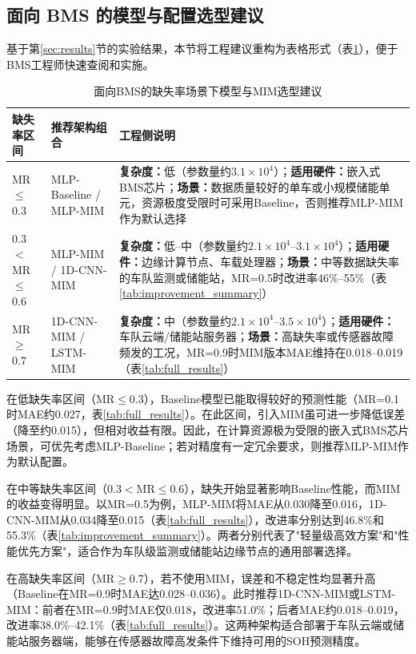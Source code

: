 \documentclass[10pt,a4paper]{ctexart}
\begin{document}
\subsection{面向 BMS 的模型与配置选型建议}

基于第\ref{sec:results}节的实验结果，本节将工程建议重构为表格形式（表\ref{tab:bms_selection}），便于BMS工程师快速查阅和实施。

\begin{table}[H]
\centering
\small
\caption{面向BMS的缺失率场景下模型与MIM选型建议}
\label{tab:bms_selection}
\begin{tabular}{@{}p{2.5cm}p{4cm}p{6cm}@{}}
\toprule
\textbf{缺失率区间} & \textbf{推荐架构组合} & \textbf{工程侧说明} \\
\midrule
MR$\leq$0.3 & MLP-Baseline / MLP-MIM & \textbf{复杂度：}低（参数量约$3.1\times10^4$）；\textbf{适用硬件：}嵌入式BMS芯片；\textbf{场景：}数据质量较好的单车或小规模储能单元，资源极度受限时可采用Baseline，否则推荐MLP-MIM作为默认选择 \\
\midrule
0.3$<$MR$\leq$0.6 & MLP-MIM / 1D-CNN-MIM & \textbf{复杂度：}低--中（参数量约$2.1\times10^4$--$3.1\times10^4$）；\textbf{适用硬件：}边缘计算节点、车载处理器；\textbf{场景：}中等数据缺失率的车队监测或储能站，MR=0.5时改进率46\%--55\%（表\ref{tab:improvement_summary}） \\
\midrule
MR$\geq$0.7 & 1D-CNN-MIM / LSTM-MIM & \textbf{复杂度：}中（参数量约$2.1\times10^4$--$3.5\times10^4$）；\textbf{适用硬件：}车队云端/储能站服务器；\textbf{场景：}高缺失率或传感器故障频发的工况，MR=0.9时MIM版本MAE维持在0.018--0.019（表\ref{tab:full_results}） \\
\bottomrule
\end{tabular}
\end{table}

在低缺失率区间（MR$\leq$0.3），Baseline模型已能取得较好的预测性能（MR=0.1时MAE约0.027，表\ref{tab:full_results}）。在此区间，引入MIM虽可进一步降低误差（降至约0.015），但相对收益有限。因此，在计算资源极为受限的嵌入式BMS芯片场景，可优先考虑MLP-Baseline；若对精度有一定冗余要求，则推荐MLP-MIM作为默认配置。

在中等缺失率区间（0.3$<$MR$\leq$0.6），缺失开始显著影响Baseline性能，而MIM的收益变得明显。以MR=0.5为例，MLP-MIM将MAE从0.030降至0.016，1D-CNN-MIM从0.034降至0.015（表\ref{tab:full_results}），改进率分别达到46.8\%和55.3\%（表\ref{tab:improvement_summary}）。两者分别代表了"轻量级高效方案"和"性能优先方案"，适合作为车队级监测或储能站边缘节点的通用部署选择。

在高缺失率区间（MR$\geq$0.7），若不使用MIM，误差和不稳定性均显著升高（Baseline在MR=0.9时MAE达0.028--0.036）。此时推荐1D-CNN-MIM或LSTM-MIM：前者在MR=0.9时MAE仅0.018，改进率51.0\%；后者MAE约0.018--0.019，改进率38.0\%--42.1\%（表\ref{tab:full_results}）。这两种架构适合部署于车队云端或储能站服务器端，能够在传感器故障高发条件下维持可用的SOH预测精度。
\end{document}
